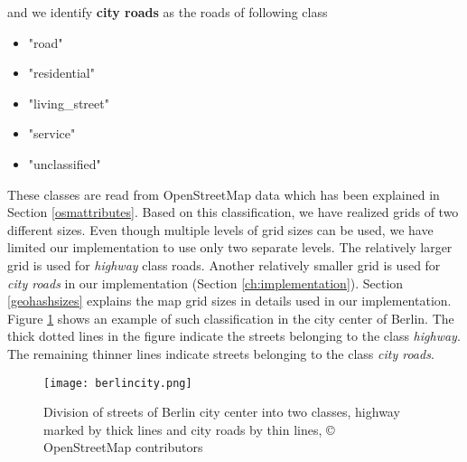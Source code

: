 and we identify \textbf{city roads} as the roads of following class
\begin{itemize}
\item "road"
\item "residential"
\item "living{\_}street"
\item "service"
\item "unclassified"
\end{itemize} 


These classes are read from OpenStreetMap data which has been explained in Section \ref{osmattributes}. Based on this classification, we have realized grids of two different sizes. Even though multiple levels of grid sizes can be used, we have limited our implementation to use only two separate levels. The relatively larger grid is used for \textit{highway} class roads. Another relatively smaller grid is used for \textit{city roads} in our implementation (Section \ref{ch:implementation}). Section \ref{geohashsizes} explains the map grid sizes in details used in our implementation. Figure \ref{fg:diffroads} shows an example of such classification in the city center of Berlin. The thick dotted lines in the figure indicate the streets belonging to the class \textit{highway}. The remaining thinner lines indicate streets belonging to the class \textit{city roads}. 


\begin{figure}
\centering
\texttt{[image: berlincity.png]}
\caption{Division of streets of Berlin city center into two classes, highway marked by thick lines and city roads by thin lines, {\copyright} OpenStreetMap contributors }
\label{fg:diffroads}
\end{figure}  



